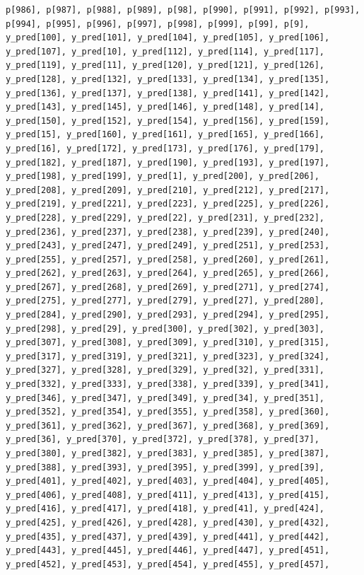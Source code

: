 \documentclass[
  letterpaper,
  DIV=11,
  numbers=noendperiod]{scrartcl}
\begin{document}
\begin{verbatim}
p[986], p[987], p[988], p[989], p[98], p[990], p[991], p[992], p[993],
p[994], p[995], p[996], p[997], p[998], p[999], p[99], p[9],
y_pred[100], y_pred[101], y_pred[104], y_pred[105], y_pred[106],
y_pred[107], y_pred[10], y_pred[112], y_pred[114], y_pred[117],
y_pred[119], y_pred[11], y_pred[120], y_pred[121], y_pred[126],
y_pred[128], y_pred[132], y_pred[133], y_pred[134], y_pred[135],
y_pred[136], y_pred[137], y_pred[138], y_pred[141], y_pred[142],
y_pred[143], y_pred[145], y_pred[146], y_pred[148], y_pred[14],
y_pred[150], y_pred[152], y_pred[154], y_pred[156], y_pred[159],
y_pred[15], y_pred[160], y_pred[161], y_pred[165], y_pred[166],
y_pred[16], y_pred[172], y_pred[173], y_pred[176], y_pred[179],
y_pred[182], y_pred[187], y_pred[190], y_pred[193], y_pred[197],
y_pred[198], y_pred[199], y_pred[1], y_pred[200], y_pred[206],
y_pred[208], y_pred[209], y_pred[210], y_pred[212], y_pred[217],
y_pred[219], y_pred[221], y_pred[223], y_pred[225], y_pred[226],
y_pred[228], y_pred[229], y_pred[22], y_pred[231], y_pred[232],
y_pred[236], y_pred[237], y_pred[238], y_pred[239], y_pred[240],
y_pred[243], y_pred[247], y_pred[249], y_pred[251], y_pred[253],
y_pred[255], y_pred[257], y_pred[258], y_pred[260], y_pred[261],
y_pred[262], y_pred[263], y_pred[264], y_pred[265], y_pred[266],
y_pred[267], y_pred[268], y_pred[269], y_pred[271], y_pred[274],
y_pred[275], y_pred[277], y_pred[279], y_pred[27], y_pred[280],
y_pred[284], y_pred[290], y_pred[293], y_pred[294], y_pred[295],
y_pred[298], y_pred[29], y_pred[300], y_pred[302], y_pred[303],
y_pred[307], y_pred[308], y_pred[309], y_pred[310], y_pred[315],
y_pred[317], y_pred[319], y_pred[321], y_pred[323], y_pred[324],
y_pred[327], y_pred[328], y_pred[329], y_pred[32], y_pred[331],
y_pred[332], y_pred[333], y_pred[338], y_pred[339], y_pred[341],
y_pred[346], y_pred[347], y_pred[349], y_pred[34], y_pred[351],
y_pred[352], y_pred[354], y_pred[355], y_pred[358], y_pred[360],
y_pred[361], y_pred[362], y_pred[367], y_pred[368], y_pred[369],
y_pred[36], y_pred[370], y_pred[372], y_pred[378], y_pred[37],
y_pred[380], y_pred[382], y_pred[383], y_pred[385], y_pred[387],
y_pred[388], y_pred[393], y_pred[395], y_pred[399], y_pred[39],
y_pred[401], y_pred[402], y_pred[403], y_pred[404], y_pred[405],
y_pred[406], y_pred[408], y_pred[411], y_pred[413], y_pred[415],
y_pred[416], y_pred[417], y_pred[418], y_pred[41], y_pred[424],
y_pred[425], y_pred[426], y_pred[428], y_pred[430], y_pred[432],
y_pred[435], y_pred[437], y_pred[439], y_pred[441], y_pred[442],
y_pred[443], y_pred[445], y_pred[446], y_pred[447], y_pred[451],
y_pred[452], y_pred[453], y_pred[454], y_pred[455], y_pred[457],

\end{verbatim}
\end{document}
